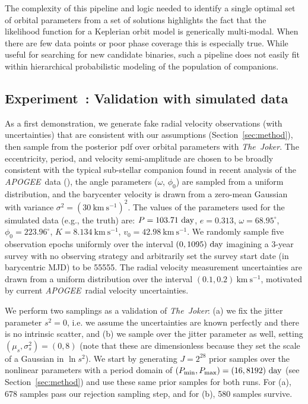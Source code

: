 \documentclass[manuscript, letterpaper]{aastex6}
\newcommand{\project}[1]{\textsl{#1}}
\newcommand{\acronym}[1]{{\small{#1}}}
\newcommand{\apogee}{\project{\acronym{APOGEE}}}
\newcommand{\samplername}{\project{The~Joker}}
\newcommand{\sectionname}{Section}
\newcommand{\kms}{\mathrm{km}~\mathrm{s}^{-1}}
\newcounter{expcounter}
\begin{document}
The complexity of this pipeline and logic needed to identify a single optimal
set of orbital parameters from a set of solutions highlights the fact that the
likelihood function for a Keplerian orbit model is generically multi-modal.
When there are few data points or poor phase coverage this is especially true.
While useful for searching for new candidate binaries, such a pipeline does not
easily fit within hierarchical probabilistic modeling of the population of
companions.

\subsection{Experiment~: Validation with simulated data}
\label{sec:validation}

As a first demonstration, we generate fake radial velocity observations (with
uncertainties) that are consistent with our assumptions
(\sectionname~\ref{sec:method}), then sample from the posterior pdf over orbital
parameters with \samplername.
The eccentricity, period, and velocity semi-amplitude are chosen to be broadly
consistent with the typical sub-stellar companion found in recent analysis of
the \apogee\ data (\citealt{Troup:2016}), the angle parameters ($\omega$,
$\phi_0$) are sampled from a uniform distribution, and the barycenter velocity
is drawn from a zero-mean Gaussian with variance $\sigma^2 = (30~\kms)^2$.
The values of the parameters used for the simulated data (e.g., the truth) are:
$P = 103.71~{\rm day}$, $e = 0.313$, $\omega = 68.95^\circ$,
$\phi_0 = 223.96^\circ$, $K = 8.134~\kms$, $v_0 = 42.98~\kms$.
We randomly sample five observation epochs uniformly over the interval $(0,1095)~{\rm day}$
imagining a 3-year survey with no observing strategy and arbitrarily set the
survey start date (in barycentric MJD) to be 55555.
The radial velocity measurement uncertainties are drawn from a uniform
distribution over the interval $(0.1, 0.2)~\kms$, motivated by current \apogee\
radial velocity uncertainties.

We perform two samplings as a validation of \samplername:
(a) we fix the jitter parameter $s^2 = 0$, i.e. we assume the uncertainties are
known perfectly and there is no intrinsic scatter, and (b) we sample over the
jitter parameter as well, setting $(\mu_s,\sigma^2_s) = (0,8)$ (note that these
are dimensionless because they set the scale of a Gaussian in $\ln s^2$).
We start by generating $J=2^{28}$ prior samples over the nonlinear parameters
with a period domain of $(P_{\rm min}, P_{\rm max}) = (16, 8192)~{\rm day}$ (see
\sectionname~\ref{sec:method}) and use these same prior samples for both runs.
For (a), 678 samples pass our rejection sampling step, and for (b), 580 samples
survive.
\end{document}
